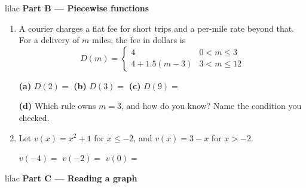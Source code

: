 \documentclass[10pt]{article}
\begin{document}
\vspace{0.14in}

\begin{headlinebox}{lilac}
\textbf{\color{plum}Part B --- Piecewise functions}
\end{headlinebox}

\begin{enumerate}[leftmargin=1.9em, itemsep=9pt, start=4]

\item A courier charges a flat fee for short trips and a per-mile rate beyond that. For a
      delivery of $m$ miles, the fee in dollars is
      \[ D(m) = \begin{cases} 4 & 0 < m \le 3 \\[2pt] 4 + 1.5(m - 3) & 3 < m \le 12 \end{cases} \]

      \textbf{(a)} $D(2) = $  \hfill
      \textbf{(b)} $D(3) = $  \hfill
      \textbf{(c)} $D(9) = $ 

      \textbf{(d)} Which rule owns $m = 3$, and how do you know? Name the condition you checked.

\item Let $v(x) = x^2 + 1$ for $x \le -2$, and $v(x) = 3 - x$ for $x > -2$.

      $v(-4) = $  \qquad $v(-2) = $  \qquad $v(0) = $ 

\end{enumerate}

\newpage

\begin{headlinebox}{lilac}
\textbf{\color{plum}Part C --- Reading a graph}
\end{headlinebox}
\end{document}
